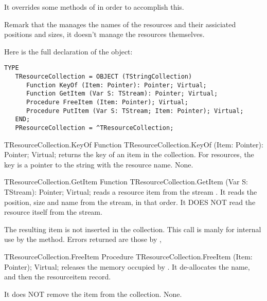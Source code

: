 It overrides some methods of  in order to accomplish
this. 

Remark that the  manages the names of the
resources and their assiciated positions and sizes, it doesn't manage
the resources themselves.

Here is the full declaration of the  object:
\begin{verbatim}
TYPE
   TResourceCollection = OBJECT (TStringCollection)
      Function KeyOf (Item: Pointer): Pointer; Virtual;
      Function GetItem (Var S: TStream): Pointer; Virtual;
      Procedure FreeItem (Item: Pointer); Virtual;
      Procedure PutItem (Var S: TStream; Item: Pointer); Virtual;
   END;
   PResourceCollection = ^TResourceCollection;
\end{verbatim}

\begin{function}{TResourceCollection.KeyOf}
\Declaration
Function TResourceCollection.KeyOf (Item: Pointer): Pointer; Virtual;
\Description
{} returns the key of an item in the collection. For resources, the
key is a pointer to the string with the resource name.
\Errors
None.
\SeeAlso
{}
\end{function}

\begin{function}{TResourceCollection.GetItem}
\Declaration
Function TResourceCollection.GetItem (Var S: TStream): Pointer; Virtual;
\Description
{} reads a resource item from the stream . It reads the
position, size and name from the stream, in that order. It DOES NOT read the
resource itself from the stream.

The resulting item is not inserted in the collection. This call is manly for
internal use by the  method.
\Errors
Errors returned are those by 
\SeeAlso
{}, 
\end{function}

\begin{procedure}{TResourceCollection.FreeItem}
\Declaration
Procedure TResourceCollection.FreeItem (Item: Pointer); Virtual;
\Description
{} releases the memory occupied by . It de-allocates
the name, and then the resourceitem record.

It does NOT remove the item from the collection.
\Errors
None.
\SeeAlso
{}
\end{procedure}

